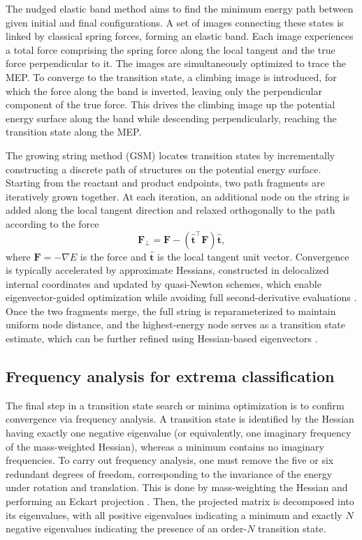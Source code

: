 \documentclass[pdflatex,sn-mathphys-num]{sn-jnl}%
\begin{document}
The nudged elastic band method aims to find the minimum energy path between given initial and final configurations. A set of images connecting these states is linked by classical spring forces, forming an elastic band. Each image experiences a total force comprising the spring force along the local tangent and the true force perpendicular to it. The images are simultaneously optimized to trace the MEP. To converge to the transition state, a climbing image is introduced, for which the force along the band is inverted, leaving only the perpendicular component of the true force. This drives the climbing image up the potential energy surface along the band while descending perpendicularly, reaching the transition state along the MEP.

The growing string method (GSM) locates transition states by incrementally constructing a discrete path of structures on the potential energy surface. Starting from the reactant and product endpoints, two path fragments are iteratively grown together. At each iteration, an additional node on the string is added along the local tangent direction and relaxed orthogonally to the path according to the force
\begin{equation}
\mathbf{F}_{\bot} = \mathbf{F} - (\hat{\mathbf{t}}^{\top} \mathbf{F}) \hat{\mathbf{t}},
\end{equation}
where $\mathbf{F} = -\nabla E$ is the force and $\hat{\mathbf{t}}$ is the local tangent unit vector. Convergence is typically accelerated by approximate Hessians, constructed in delocalized internal coordinates and updated by quasi-Newton schemes, which enable eigenvector-guided optimization while avoiding full second-derivative evaluations \citep{zimmerman2015}. Once the two fragments merge, the full string is reparameterized to maintain uniform node distance, and the highest-energy node serves as a transition state estimate, which can be further refined using Hessian-based eigenvectors \citep{peters2004}.

\subsection{Frequency analysis for extrema classification}
The final step in a transition state search or minima optimization is to confirm convergence via frequency analysis. A transition state is identified by the Hessian having exactly one negative eigenvalue (or equivalently, one imaginary frequency of the mass-weighted Hessian), whereas a minimum contains no imaginary frequencies. 
To carry out frequency analysis, one must remove the five or six redundant degrees of freedom, corresponding to the invariance of the energy under rotation and translation. This is done by mass-weighting the Hessian and performing an Eckart projection \citep{louck1976}. Then, the projected matrix is decomposed into its eigenvalues, with all positive eigenvalues indicating a minimum and exactly $N$ negative eigenvalues indicating the presence of an order-$N$ transition state. 
\end{document}
